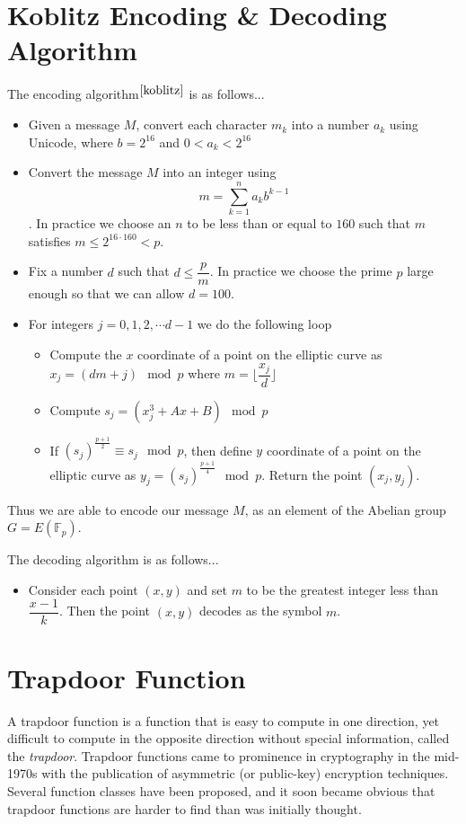 \documentclass[cryptography,article,submit,moreauthors,pdftex]{Definitions/mdpi}
\begin{document}
\section{Koblitz Encoding \& Decoding Algorithm}
\begin{flushleft}
	The encoding algorithm$^{\cite{koblitz}}$ is as follows...\\
	\begin{itemize}
		\item Given a message $M$, convert each character $m_k$ into a number $a_k$ using Unicode, where $b=2^{16}$ and $0<a_k<2^{16}$
		\item Convert the message $M$ into an integer using $$m=\sum_{k=1}^n a_kb^{k-1}$$. In practice we choose an $n$ to be less than or equal to $160$ such that $m$ satisfies $m\le 2^{16\cdot 160}<p$.
		\item Fix a number $d$ such that $d\le \dfrac{p}{m}$. In practice we choose the prime $p$ large enough so that we can allow $d=100$.
		\item For integers $j=0,1,2,\cdots d-1$  we do the following loop
		\begin{itemize}
			\item Compute the $x$ coordinate of a point on the elliptic curve as $x_j=(dm+j)\mod p$ where $m=\bigg\lfloor{\dfrac{x_j}{d}}\bigg\rfloor$
			\item Compute $s_j=(x_j^3+Ax+B)\mod p$
			\item If $\left(s_j\right)^{\frac{p+1}{2}}\equiv s_j\mod p$, then define $y$ coordinate of a point on the elliptic curve as $y_j=\left(s_j\right)^{\frac{p+1}{4}}\mod p$. Return the point $(x_j,y_j)$.
		\end{itemize}
	\end{itemize}
	
	Thus we are able to encode our message $M$, as an element of the Abelian group $G=E\left(\mathbb{F}_p\right)$.
	
	The decoding algorithm is as follows...\\
	\begin{itemize}
	    \item Consider each point $(x,y)$ and set $m$ to be the greatest integer less than $\dfrac{x-1}k$. Then the point $(x,y)$ decodes as the symbol $m$. 
	\end{itemize}
\end{flushleft}

\section{Trapdoor Function}
\begin{flushleft}
A trapdoor function is a function that is easy to compute in one direction, yet difficult to compute in the opposite direction without special information, called the \textit{trapdoor}. Trapdoor functions came to prominence in cryptography in the mid-1970s with the publication of asymmetric (or public-key) encryption techniques. Several function classes have been proposed, and it soon became obvious that trapdoor functions are harder to find than was initially thought.
\end{flushleft}
\end{document}
